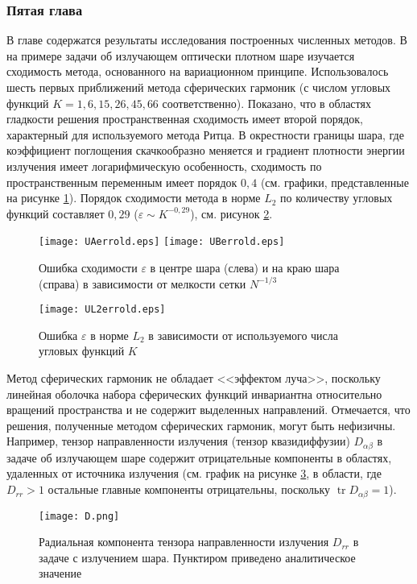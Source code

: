 \subsubsection*{Пятая глава}
В главе содержатся результаты исследования построенных численных методов. В
 на примере задачи об излучающем оптически плотном шаре
изучается сходимость метода, основанного на вариационном принципе. Использовалось шесть первых приближений метода сферических гармоник (с числом угловых функций $K = 1, 6, 15, 26, 45, 66$ соответственно).
Показано, что в областях гладкости решения пространственная сходимость имеет второй порядок, характерный для используемого метода Ритца. В окрестности границы шара, где коэффициент поглощения скачкообразно меняется и градиент плотности энергии излучения имеет логарифмическую особенность, сходимость по пространственным переменным имеет порядок $0,4$ (см. графики, представленные на рисунке \ref{fig:sphconv}). Порядок сходимости метода в норме $L_2$ по количеству угловых функций составляет $0,29$ ($\varepsilon \sim K^{-0,29}$), см. рисунок \ref{fig:angconv}.
\begin{figure}[ht!]
\centering
\texttt{[image: UAerrold.eps]}
\texttt{[image: UBerrold.eps]}
\caption{Ошибка сходимости $\varepsilon$ в центре шара (слева) и на краю шара (справа) в зависимости от мелкости сетки $N^{-1/3}$}
\label{fig:sphconv}
\end{figure}
\begin{figure}[ht!]
\centering
\texttt{[image: UL2errold.eps]}
\caption{Ошибка $\varepsilon$ в норме $L_2$ в зависимости от используемого числа угловых функций $K$}
\label{fig:angconv}
\end{figure}

Метод сферических гармоник не обладает <<эффектом луча>>, поскольку линейная оболочка набора сферических функций инвариантна относительно вращений пространства и не содержит выделенных направлений.
Отмечается, что решения, полученные методом сферических гармоник, могут быть нефизичны. Например, тензор направленности излучения (тензор квазидиффузии) $D_{\alpha \beta}$ в задаче об излучающем шаре содержит отрицательные компоненты в областях, удаленных от источника излучения (см. график на рисунке \ref{fig:Drr}, в области, где $D_{rr} > 1$ остальные главные компоненты отрицательны, поскольку $\operatorname{tr} D_{\alpha\beta} = 1$). 
\begin{figure}[ht!]
\centering
\texttt{[image: D.png]}
\caption{Радиальная компонента тензора направленности излучения $D_{rr}$ в задаче с излучением шара. Пунктиром приведено аналитическое значение}
\label{fig:Drr}
\end{figure}


